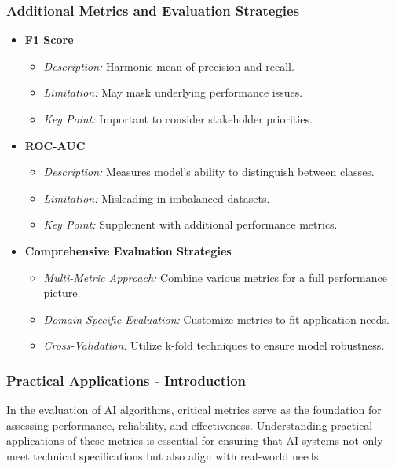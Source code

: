 \documentclass[aspectratio=169]{beamer}
\begin{document}
\begin{frame}[fragile]
    \frametitle{Additional Metrics and Evaluation Strategies}
    \begin{itemize}
        \item \textbf{F1 Score}
            \begin{itemize}
                \item \textit{Description:} Harmonic mean of precision and recall.
                \item \textit{Limitation:} May mask underlying performance issues.
                \item \textit{Key Point:} Important to consider stakeholder priorities.
            \end{itemize}
        
        \item \textbf{ROC-AUC}
            \begin{itemize}
                \item \textit{Description:} Measures model's ability to distinguish between classes.
                \item \textit{Limitation:} Misleading in imbalanced datasets.
                \item \textit{Key Point:} Supplement with additional performance metrics.
            \end{itemize}
        
        \item \textbf{Comprehensive Evaluation Strategies}
            \begin{itemize}
                \item \textit{Multi-Metric Approach:} Combine various metrics for a full performance picture.
                \item \textit{Domain-Specific Evaluation:} Customize metrics to fit application needs.
                \item \textit{Cross-Validation:} Utilize k-fold techniques to ensure model robustness.
            \end{itemize}
    \end{itemize}
\end{frame}

\begin{frame}[fragile]
    \frametitle{Practical Applications - Introduction}
    In the evaluation of AI algorithms, critical metrics serve as the foundation for assessing performance, reliability, and effectiveness. Understanding practical applications of these metrics is essential for ensuring that AI systems not only meet technical specifications but also align with real-world needs.
\end{frame}
\end{document}
